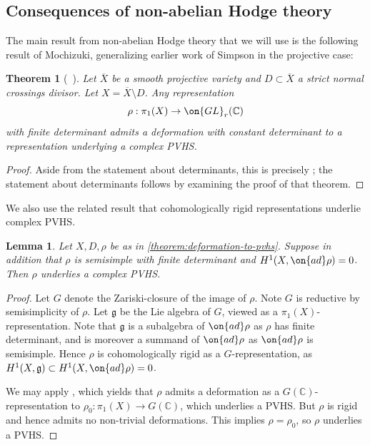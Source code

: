 \documentclass[12 pt]{amsart}
\theoremstyle{plain}
\newtheorem{theorem}[subsubsection]{Theorem}
\newtheorem{lemma}[subsubsection]{Lemma}
\theoremstyle{definition}
\theoremstyle{remark}
\numberwithin{equation}{section}
\begin{document}
\subsection{Consequences of non-abelian Hodge theory}
The main result from non-abelian Hodge theory that we will use is the following result of Mochizuki, generalizing earlier work of Simpson in the projective case:
\begin{theorem}[~]
	\label{theorem:deformation-to-pvhs}
	Let $\overline{X}$ be a smooth projective variety and $D\subset
	\overline{X}$ a strict normal crossings divisor. Let
	$X=\overline{X}\setminus D$. 
	Any representation $$\rho: \pi_1(X)\to
	\on{GL}_r(\mathbb{C})$$ with finite determinant admits a
	deformation with constant determinant to a representation underlying a complex PVHS.
\end{theorem}
\begin{proof}
Aside from the statement about determinants, this is precisely	\cite[Theorem 10.5]{mochizuki2006kobayashi}; the statement about determinants follows by examining the proof of that theorem. 
\end{proof}

We also use the related result that cohomologically rigid representations underlie complex PVHS.
\begin{lemma}\label{lemma:rigid-reps}
Let $X, D, \rho$ be as in \autoref{theorem:deformation-to-pvhs}. Suppose in
addition that $\rho$ is semisimple with finite determinant and $H^1(X, \on{ad}\rho)=0$. Then $\rho$ underlies a complex PVHS.
\end{lemma}
\begin{proof}
	Let $G$ denote the Zariski-closure of the image of $\rho$.
	Note $G$ is reductive by semisimplicity of $\rho$. Let $\mathfrak{g}$ be
	the Lie algebra of $G$, viewed as a $\pi_1(X)$-representation. Note
	that $\mathfrak{g}$ is a subalgebra of $\on{ad}\rho$ as $\rho$ has
	finite determinant, and is moreover a summand of $\on{ad}\rho$ as
	$\on{ad}\rho$ is semisimple. Hence $\rho$ is cohomologically rigid as a
	$G$-representation, as $H^1(X, \mathfrak{g}) \subset H^1(X, \on{ad}
	\rho) =0$.
	
	We may apply \cite[Lemma 10.13]{mochizuki2006kobayashi},
	which yields that 
	$\rho$ admits a deformation as a $G(\mathbb C)$-representation to 
	$\rho_0: \pi_1(X) \to G(\mathbb C)$, which
	underlies a PVHS.
	But 
	$\rho$ is rigid and hence admits no
	non-trivial deformations.	This implies $\rho = \rho_0$, so $\rho$ underlies a PVHS.
\end{proof}
\end{document}
